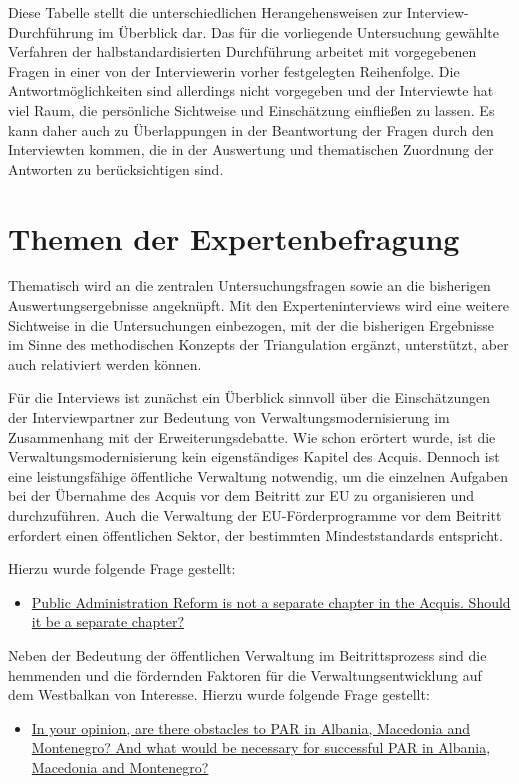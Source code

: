 Diese Tabelle stellt die unterschiedlichen Herangehensweisen zur Interview-Durchführung im Überblick dar. Das für die vorliegende Untersuchung gewählte Verfahren der halbstandardisierten Durchführung arbeitet mit vorgegebenen Fragen in einer von der Interviewerin vorher festgelegten Reihenfolge. Die Antwortmöglichkeiten sind allerdings nicht vorgegeben und der Interviewte hat viel Raum, die persönliche Sichtweise und Einschätzung einfließen zu lassen. Es kann daher auch zu Überlappungen in der Beantwortung der Fragen durch den Interviewten kommen, die in der Auswertung und thematischen Zuordnung der Antworten zu berücksichtigen sind.
\section{Themen der Expertenbefragung} 
Thematisch wird an die zentralen Untersuchungsfragen sowie an die bisherigen Auswertungsergebnisse angeknüpft. Mit den Experteninterviews wird eine weitere Sichtweise in die Untersuchungen einbezogen, mit der die bisherigen Ergebnisse im Sinne des methodischen Konzepts der Triangulation ergänzt, unterstützt, aber auch relativiert werden können.\par
Für die Interviews ist zunächst ein Überblick sinnvoll über die Einschätzungen der Interviewpartner zur Bedeutung von Verwaltungsmodernisierung im Zusammenhang mit der Erweiterungsdebatte. Wie schon erörtert wurde, ist die Verwaltungsmodernisierung kein eigenständiges Kapitel des Acquis. Dennoch ist eine leistungsfähige öffentliche Verwaltung notwendig, um die einzelnen Aufgaben bei der Übernahme des Acquis vor dem Beitritt zur EU zu organisieren und durchzuführen. Auch die Verwaltung der EU-Förderprogramme vor dem Beitritt erfordert einen öffentlichen Sektor, der bestimmten Mindeststandards entspricht.\par
Hierzu wurde folgende Frage gestellt:\par
\begin{itemize}[label={}]
\item \ul{Public Administration Reform is not a separate chapter in the Acquis. Should it be a separate chapter?}
\end{itemize}
Neben der Bedeutung der öffentlichen Verwaltung im Beitrittsprozess sind die hemmenden und die fördernden Faktoren für die Verwaltungsentwicklung auf dem Westbalkan von Interesse. Hierzu wurde folgende Frage gestellt:
\begin{itemize}[label={}]
\item \ul{In your opinion, are there obstacles to PAR in Albania, Macedonia and Montenegro? And what would be necessary for successful PAR in Albania, Macedonia and Montenegro?}
\end{itemize}
